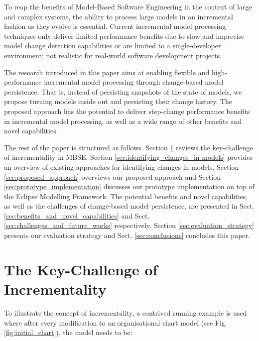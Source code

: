 \documentclass{llncs}
\begin{document}

To reap the benefits of Model-Based Software Engineering in the context of large and complex systems, the ability to process large models in an incremental fashion as they evolve is essential. Current incremental model processing techniques only deliver limited performance benefits due to slow and imprecise model change detection capabilities or are limited to a single-developer environment; not realistic for real-world software development projects.

The research introduced in this paper aims at enabling flexible and high-performance incremental model processing through change-based model persistence. That is, instead of persisting snapshots of the state of models, we propose turning models inside out and persisting their change history. The proposed approach has the potential to deliver step-change performance benefits in incremental model processing, as well as a wide range of other benefits and novel capabilities.

The rest of the paper is structured as follows. Section \ref{sec:the_key_challenge_of_ _incrementality} reviews the key-challenge of incrementality in MBSE. Section \ref{sec:identifying_changes_in models} provides an overview of existing approaches for identifying changes in models. Section \ref{sec:proposed_approach} overviews our proposed approach and Section \ref{sec:prototype_implementation} discusses our prototype implementation on top of the Eclipse Modelling Framework. The potential benefits and novel capabilities, as well as the challenges of change-based model persistence, are presented in Sect. \ref{sec:benefits_and_novel_capabilities} and Sect. \ref{sec:challenges_and_future_works} respectively. Section \ref{sec:evaluation_strategy} presents our evaluation strategy and Sect. \ref{sec:conclusions} concludes this paper.

\section{The Key-Challenge of Incrementality}
\label{sec:the_key_challenge_of_ _incrementality}
To illustrate the concept of incrementality, a contrived running example is used where after every modification to an organisational chart model (see Fig. \ref{fig:initial_chart}), the model needs to be:
\end{document}
